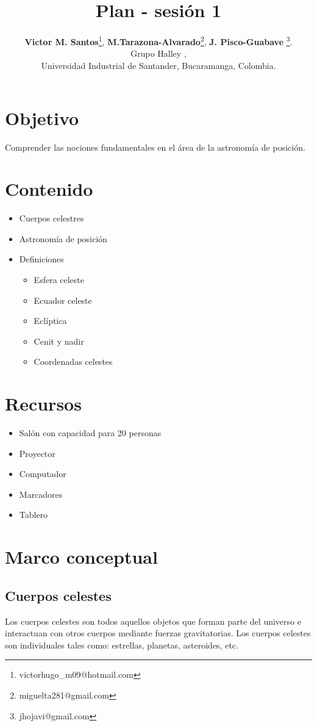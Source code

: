 \documentclass[10pt,a4paper]{article}
\title{Plan - sesión 1}
\author{\textbf{Victor M. Santos}\thanks{victorhugo\_m09@hotmail.com}, \textbf{M.Tarazona-Alvarado}\thanks{miguelta281@gmail.com}, \textbf{J. Pisco-Guabave} \thanks{jhojavi@gmail.com}. \\ Grupo Halley , \\ Universidad Industrial de Santander, Bucaramanga, Colombia.}
\date{ }
\begin{document}
\maketitle

\tableofcontents
\section{Objetivo}
Comprender las nociones fundamentales en el área de la astronomía de posición.
\section{Contenido}
\begin{itemize}
\item Cuerpos celestres 
\item Astronomía de posición
\item Definiciones 
 \begin{itemize}
  \item Esfera celeste
  \item Ecuador celeste
  \item Eclíptica
  \item Cenit y nadir
  \item Coordenadas celestes
 \end{itemize}
\end{itemize}
\section{Recursos}
\begin{itemize}
 \item Salón con capacidad para 20 personas
 \item Proyector
 \item Computador
 \item Marcadores
 \item Tablero
\end{itemize}


\section{Marco conceptual}
\subsection{Cuerpos celestes}
Los cuerpos celestes son todos aquellos objetos que forman parte del universo e interactuan con otros cuerpos mediante fuerzas gravitatorias. Los cuerpos celestes son individuales tales como: estrellas, planetas, asteroides, etc.\\
\end{document}
